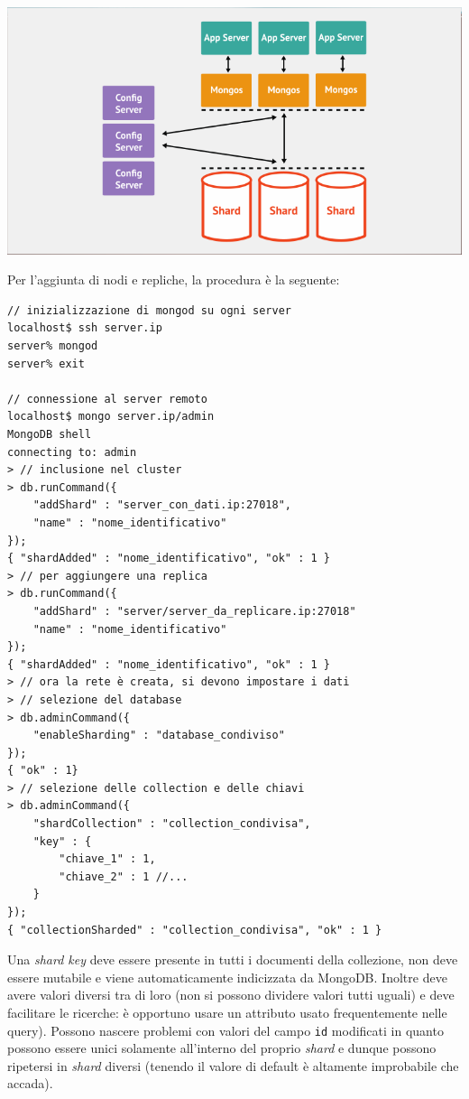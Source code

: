 \documentclass[a4page, 11pt]{article}
\begin{document}
\begin{center}
  \includegraphics[scale=0.40]{IMAGE6.png}
\end{center}

Per l'aggiunta di nodi e repliche, la procedura è la seguente:
\begin{verbatim}
// inizializzazione di mongod su ogni server
localhost$ ssh server.ip
server% mongod
server% exit

// connessione al server remoto
localhost$ mongo server.ip/admin
MongoDB shell
connecting to: admin
> // inclusione nel cluster
> db.runCommand({
    "addShard" : "server_con_dati.ip:27018",
    "name" : "nome_identificativo"
});
{ "shardAdded" : "nome_identificativo", "ok" : 1 }
> // per aggiungere una replica
> db.runCommand({
    "addShard" : "server/server_da_replicare.ip:27018"
    "name" : "nome_identificativo"
});
{ "shardAdded" : "nome_identificativo", "ok" : 1 }
> // ora la rete è creata, si devono impostare i dati
> // selezione del database
> db.adminCommand({
    "enableSharding" : "database_condiviso"
});
{ "ok" : 1}
> // selezione delle collection e delle chiavi
> db.adminCommand({
    "shardCollection" : "collection_condivisa",
    "key" : {
        "chiave_1" : 1,
        "chiave_2" : 1 //...
    }
});
{ "collectionSharded" : "collection_condivisa", "ok" : 1 }
\end{verbatim}

Una \textit{shard key} deve essere presente in tutti i documenti della collezione, non deve essere mutabile e viene automaticamente indicizzata da MongoDB.
Inoltre deve avere valori diversi tra di loro (non si possono dividere valori tutti uguali) e deve facilitare le ricerche: è opportuno usare un attributo usato frequentemente nelle query).
Possono nascere problemi con valori del campo \verb|id| modificati in quanto possono essere unici solamente all'interno del proprio \textit{shard} e dunque possono ripetersi in \textit{shard} diversi (tenendo il valore di default è altamente improbabile che accada).
\end{document}
